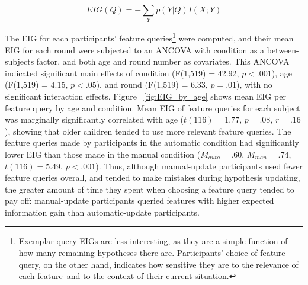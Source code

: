 \documentclass[10pt,letterpaper]{article}
\begin{document}
\begin{equation}
  EIG(Q) = -\sum_{Y} p(Y|Q) I(X;Y)
\end{equation}

The EIG for each participants' feature queries\footnote{Exemplar query EIGs are 
less interesting, as they are a simple function of how many remaining hypotheses 
there are. Participants' choice of feature query, on the other hand, indicates how 
sensitive they are to the relevance of each feature--and to the context of their 
current situation.} were computed, and their mean EIG for each round were 
subjected to an ANCOVA with condition as a between-subjects factor, and both age 
and round number as covariates. This ANCOVA indicated significant main effects of 
condition (F(1,519) = 42.92, $p<.001$), age (F(1,519) = 4.15, $p<.05$), and round 
(F(1,519) = 6.33, $p = .01$), with no significant interaction effects. Figure~
\ref{fig:EIG_by_age} shows mean EIG per feature query by age and condition. Mean 
EIG of feature queries for each subject was marginally significantly correlated with 
age ($t(116)=1.77$, $p=.08$, $r=.16$), showing that older children tended to use 
more relevant feature queries. The feature queries made by participants in the 
automatic condition had significantly lower EIG than those made in the manual 
condition ($M_{auto} = .60$, $M_{man} = .74$, $t(116) = 5.49$,  $p<.001$). Thus, 
although manual-update participants used fewer feature queries overall, and tended 
to make mistakes during hypothesis updating, the greater amount of time they spent 
when choosing a feature query tended to pay off: manual-update participants 
queried features with higher expected information gain than automatic-update 
participants. 


\end{document}
